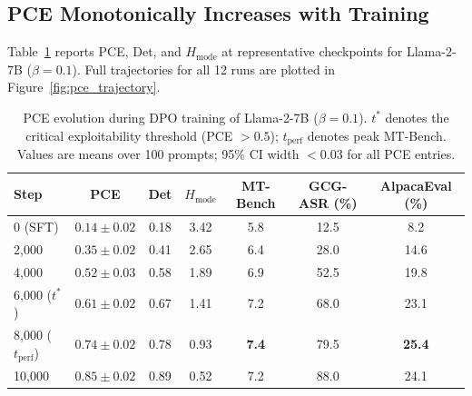 \subsection{PCE Monotonically Increases with Training}
\label{sec:res_evolution}

Table~\ref{tab:pce_evolution} reports PCE, Det, and $H_{\text{mode}}$ at representative checkpoints for Llama-2-7B ($\beta = 0.1$). Full trajectories for all 12 runs are plotted in Figure~\ref{fig:pce_trajectory}.

\begin{table}[t]
\centering
\caption{PCE evolution during DPO training of Llama-2-7B ($\beta = 0.1$). $t^*$ denotes the critical exploitability threshold (PCE $> 0.5$); $t_{\text{perf}}$ denotes peak MT-Bench. Values are means over 100 prompts; 95\% CI width $< 0.03$ for all PCE entries.}
\label{tab:pce_evolution}
\small
\begin{tabular}{@{}lcccccc@{}}
\toprule
Step & PCE & Det & $H_{\text{mode}}$ & MT-Bench & GCG-ASR (\%) & AlpacaEval (\%) \\
\midrule
0 (SFT) & $0.14 \pm 0.02$ & 0.18 & 3.42 & 5.8 & 12.5 & 8.2 \\
2{,}000   & $0.35 \pm 0.02$ & 0.41 & 2.65 & 6.4 & 28.0 & 14.6 \\
4{,}000   & $0.52 \pm 0.03$ & 0.58 & 1.89 & 6.9 & 52.5 & 19.8 \\
6{,}000 ($t^*$) & $0.61 \pm 0.02$ & 0.67 & 1.41 & 7.2 & 68.0 & 23.1 \\
8{,}000 ($t_{\text{perf}}$) & $0.74 \pm 0.02$ & 0.78 & 0.93 & \textbf{7.4} & 79.5 & \textbf{25.4} \\
10{,}000 & $0.85 \pm 0.02$ & 0.89 & 0.52 & 7.2 & 88.0 & 24.1 \\
\bottomrule
\end{tabular}
\end{table}


